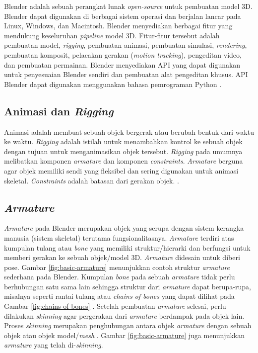 Blender adalah sebuah perangkat lunak \textit{open-source} untuk pembuatan model
3D. Blender dapat digunakan di berbagai sistem operasi dan berjalan lancar pada
Linux, Windows, dan Macintosh. Blender menyediakan berbagai fitur yang mendukung
keseluruhan \textit{pipeline} model 3D. Fitur-fitur tersebut adalah pembuatan
model, \textit{rigging}, pembuatan animasi, pembuatan simulasi,
\textit{rendering}, pembuatan komposit, pelacakan gerakan (\textit{motion
tracking}), pengeditan video, dan pembuatan permainan. Blender menyediakan API
yang dapat digunakan untuk penyesuaian Blender sendiri dan pembuatan alat
pengeditan khusus. API Blender dapat digunakan menggunakan bahasa pemrograman
Python \parencite{blender-about}.


\subsection{Animasi dan \textit{Rigging}}

Animasi adalah membuat sebuah objek
bergerak atau berubah bentuk dari waktu ke waktu. \textit{Rigging} adalah
istilah untuk menambahkan kontrol ke sebuah objek dengan tujuan untuk
menganimasikan objek tersebut. \textit{Rigging} pada umumnya melibatkan komponen
\textit{armature} dan komponen \textit{constraints}. \textit{Armature} berguna
agar objek memiliki sendi yang fleksibel dan sering digunakan untuk animasi
skeletal. \textit{Constraints} adalah batasan dari gerakan objek.
\parencite{blender-animation-and-rigging}.

\subsection{\textit{Armature}}

\textit{Armature} pada Blender merupakan objek yang serupa dengan sistem
kerangka manusia (sistem skeletal) terutama fungsionalitasnya. \textit{Armature}
terdiri atas kumpulan tulang atau \textit{bone} yang memiliki struktur/hierarki
dan berfungsi untuk memberi gerakan ke sebuah objek/model 3D. \textit{Armature}
didesain untuk diberi pose. Gambar \ref{fig:basic-armature} menunjukkan contoh
struktur \textit{armature} sederhana pada Blender. Kumpulan \textit{bone} pada
sebuah \textit{armature} tidak perlu berhubungan satu sama lain sehingga
struktur dari \textit{armature} dapat berupa-rupa, misalnya seperti rantai
tulang atau \textit{chains of bones} yang dapat dilihat pada Gambar
\ref{fig:chains-of-bones} \parencite{blender-armature-introduction,
blender-armature-structure}. Setelah pembuatan \textit{armature} selesai, perlu
dilakukan \textit{skinning} agar pergerakan dari \textit{armature} berdampak
pada objek lain. Proses \textit{skinning} merupakan penghubungan antara objek
\textit{armature} dengan sebuah objek atau objek model/\textit{mesh}
\parencite{blender-skinning-introduction}. Gambar \ref{fig:basic-armature} juga
menunjukkan \textit{armature} yang telah di-\textit{skinning}.

